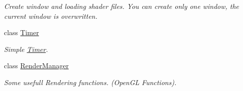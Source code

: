 \begin{DoxyCompactItemize}
\begin{DoxyCompactList}\small\item\em Create window and loading shader files. You can create only one window, the current window is overwritten. \item\end{DoxyCompactList}\item 
class \hyperlink{class_f2_c_1_1_timer}{Timer}
\begin{DoxyCompactList}\small\item\em Simple \hyperlink{class_f2_c_1_1_timer}{Timer}. \item\end{DoxyCompactList}\item 
class \hyperlink{class_f2_c_1_1_render_manager}{RenderManager}
\begin{DoxyCompactList}\small\item\em Some usefull Rendering functions. (OpenGL Functions). \item\end{DoxyCompactList}\end{DoxyCompactItemize}
